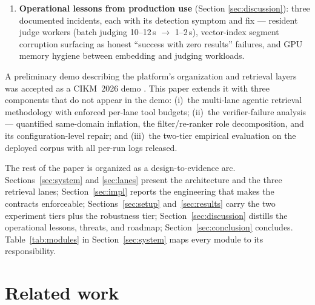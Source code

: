 \documentclass[preprint,12pt]{elsarticle}
\begin{document}
\begin{enumerate}
unsafe as an ordering), a threshold that never abstains out of corpus,
and robustness of both the failure and the repair to question paraphrase
and to the choice of verification signal.
Mitigations (hierarchical reading, relative cuts with floors, calibration)
are scoped to what this decomposition supports.
\item \textbf{Operational lessons from production use} (Section
\ref{sec:discussion}): three documented incidents, each with its detection
symptom and fix --- resident judge workers (batch judging 10--12\,s
$\to$ 1--2\,s), vector-index segment corruption surfacing as honest
``success with zero results'' failures, and GPU memory hygiene between
embedding and judging workloads.
\end{enumerate}

A preliminary demo describing the platform's organization and retrieval
layers was accepted as a CIKM~2026 demo \cite{qdcvr-demo}. This paper extends
it with three components that do not appear in the demo: (i)~the multi-lane
agentic retrieval methodology with enforced per-lane tool budgets; (ii)~the
verifier-failure analysis --- quantified same-domain inflation, the
filter/re-ranker role decomposition, and its configuration-level repair;
and (iii)~the two-tier empirical evaluation on the deployed corpus with all
per-run logs released.

The rest of the paper is organized as a design-to-evidence arc.
Sections~\ref{sec:system} and \ref{sec:lanes} present the architecture and
the three retrieval lanes; Section~\ref{sec:impl} reports the engineering
that makes the contracts enforceable; Sections~\ref{sec:setup}
and~\ref{sec:results} carry the two experiment tiers plus the robustness
tier; Section~\ref{sec:discussion} distills the operational lessons,
threats, and roadmap; Section~\ref{sec:conclusion} concludes.
Table~\ref{tab:modules} in Section~\ref{sec:system} maps every module to
its responsibility.

\section{Related work}
\label{sec:related}
\end{document}
